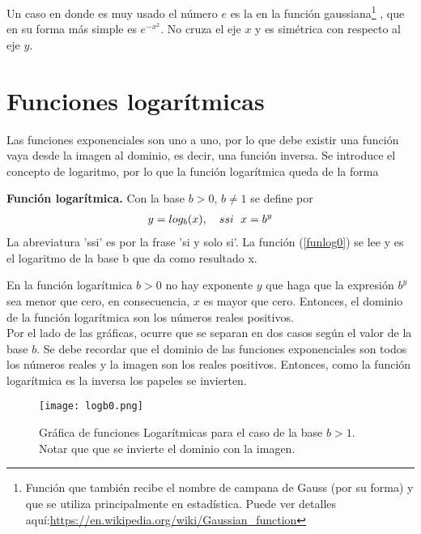 Un caso en donde es muy usado el número $e$ es la en la función gaussiana\footnote{Función que también recibe el nombre de campana de Gauss (por su forma) y que se utiliza principalmente en estadística. Puede ver detalles aquí:\url{https://en.wikipedia.org/wiki/Gaussian_function} }  , que en su forma más simple es $e^{-x^2}$. No cruza el eje $x$ y es simétrica  con respecto al eje $y$.
\section{Funciones logarítmicas}

Las funciones exponenciales son uno a uno, por lo que debe existir una función vaya desde la imagen al dominio, es decir, una función inversa. Se introduce el concepto de logaritmo, por lo que la función logarítmica queda de la forma
\begin{mydef}
\textbf{Función logarítmica. } Con la base $b>0$, $b\neq 1$ se define por
\begin{eqnarray}
y=log_{b}(x), \hspace{10px} ssi \hspace{6px} x=b^{y}
\label{funlog0}
\end{eqnarray}
La abreviatura 'ssi' es por la frase 'si y solo si'. La función (\ref{funlog0})  se lee y es el logaritmo de la base b que da como resultado x.
\end{mydef}

En la función logarítmica $b>0$ no hay exponente $y$ que haga que la expresión $b^{y}$ sea menor que cero, en consecuencia, $x$ es mayor que cero. Entonces, el dominio de la función logarítmica son los números reales positivos.\\

Por el lado de las gráficas, ocurre que se separan en dos casos según el valor de la base $b$. Se debe recordar que el dominio de las funciones exponenciales son todos los números reales y la imagen son los reales positivos. Entonces, como la función logarítmica es la inversa los papeles se invierten.

 \begin{center}
\begin{figure}[h!]
\centering
\texttt{[image: logb0.png]}
\caption[Gráfica de funciones logarítmicas para el caso de la base $b>1$]{Gráfica de funciones Logarítmicas para el caso de la base $b>1$. Notar que que se invierte el dominio con la imagen.} \label{logb0}
\end{figure}
\end{center}

